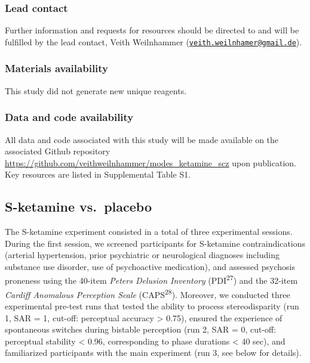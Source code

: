 \documentclass[
]{article}
\begin{document}
\hypertarget{lead-contact}{%
\subsubsection{Lead contact}\label{lead-contact}}

Further information and requests for resources should be directed to and
will be fulfilled by the lead contact, Veith Weilnhammer
(\href{mailto:veith.weilnhamer@gmail.de}{\nolinkurl{veith.weilnhamer@gmail.de}}).

\hypertarget{materials-availability}{%
\subsubsection{Materials availability}\label{materials-availability}}

This study did not generate new unique reagents.

\hypertarget{data-and-code-availability}{%
\subsubsection{Data and code
availability}\label{data-and-code-availability}}

All data and code associated with this study will be made available on
the associated Github repository
\url{https://github.com/veithweilnhammer/modes_ketamine_scz} upon publication.
Key resources are listed in Supplemental Table S1.

\hypertarget{s-ketamine-vs.-placebo}{%
\subsection{S-ketamine vs.~placebo}\label{s-ketamine-vs.-placebo}}

The S-ketamine experiment consisted in a total of three experimental
sessions. During the first session, we screened participants for
S-ketamine contraindications (arterial hypertension, prior psychiatric
or neurological diagnoses including substance use disorder, use of
psychoactive medication), and assessed psychosis proneness using the
40-item \emph{Peters Delusion Inventory} (PDI\textsuperscript{27}) and
the 32-item \emph{Cardiff Anomalous Perception Scale}
(CAPS\textsuperscript{28}). Moreover, we conducted three experimental
pre-test runs that tested the ability to process stereodisparity (run 1,
SAR = 1, cut-off: perceptual accuracy \textgreater{} 0.75), ensured the
experience of spontaneous switches during bistable perception (run 2,
SAR = 0, cut-off: perceptual stability \textless{} 0.96, corresponding
to phase durations \textless{} 40 sec), and familiarized participants
with the main experiment (run 3, see below for details).
\end{document}
